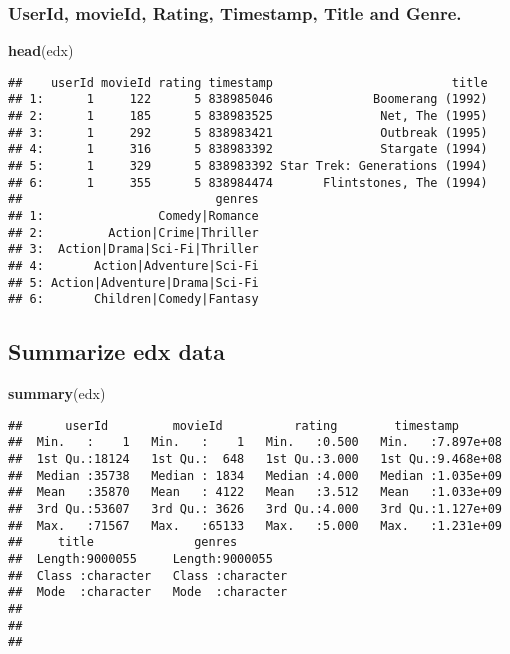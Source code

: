 \documentclass[
]{article}
\newenvironment{Shaded}{\begin{snugshade}}{\end{snugshade}}
\newcommand{\KeywordTok}[1]{\textcolor[rgb]{0.13,0.29,0.53}{\textbf{#1}}}
\newcommand{\NormalTok}[1]{#1}
\begin{document}
\hypertarget{userid-movieid-rating-timestamp-title-and-genre.}{%
\subsubsection{UserId, movieId, Rating, Timestamp, Title and
Genre.}\label{userid-movieid-rating-timestamp-title-and-genre.}}

\begin{Shaded}
\begin{Highlighting}[]
\KeywordTok{head}\NormalTok{(edx)}
\end{Highlighting}
\end{Shaded}

\begin{verbatim}
##    userId movieId rating timestamp                         title
## 1:      1     122      5 838985046              Boomerang (1992)
## 2:      1     185      5 838983525               Net, The (1995)
## 3:      1     292      5 838983421               Outbreak (1995)
## 4:      1     316      5 838983392               Stargate (1994)
## 5:      1     329      5 838983392 Star Trek: Generations (1994)
## 6:      1     355      5 838984474       Flintstones, The (1994)
##                           genres
## 1:                Comedy|Romance
## 2:         Action|Crime|Thriller
## 3:  Action|Drama|Sci-Fi|Thriller
## 4:       Action|Adventure|Sci-Fi
## 5: Action|Adventure|Drama|Sci-Fi
## 6:       Children|Comedy|Fantasy
\end{verbatim}

\hypertarget{summarize-edx-data}{%
\subsection{Summarize edx data}\label{summarize-edx-data}}

\begin{Shaded}
\begin{Highlighting}[]
\KeywordTok{summary}\NormalTok{(edx)}
\end{Highlighting}
\end{Shaded}

\begin{verbatim}
##      userId         movieId          rating        timestamp        
##  Min.   :    1   Min.   :    1   Min.   :0.500   Min.   :7.897e+08  
##  1st Qu.:18124   1st Qu.:  648   1st Qu.:3.000   1st Qu.:9.468e+08  
##  Median :35738   Median : 1834   Median :4.000   Median :1.035e+09  
##  Mean   :35870   Mean   : 4122   Mean   :3.512   Mean   :1.033e+09  
##  3rd Qu.:53607   3rd Qu.: 3626   3rd Qu.:4.000   3rd Qu.:1.127e+09  
##  Max.   :71567   Max.   :65133   Max.   :5.000   Max.   :1.231e+09  
##     title              genres         
##  Length:9000055     Length:9000055    
##  Class :character   Class :character  
##  Mode  :character   Mode  :character  
##                                       
##                                       
## 
\end{verbatim}
\end{document}
